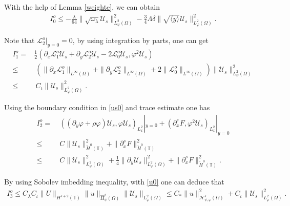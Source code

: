 \documentclass{amsart}
\numberwithin{equation}{section}
\newcommand\y{{{\langle y \rangle}}}
\begin{document}
With the help of Lemma \ref{weighte}, we can obtain
\begin{align*}
I_{0}^{o}\leq -\frac{\lambda}{64}\|\sqrt{\omega_{\lambda}}\mathcal{U}_{s}\|_{L_{\varphi}^{2}(\Omega)}^{2}
          -\frac{3}{4}\Lambda\delta\|\sqrt{\y}\mathcal{U}_{s}\|_{L_{\varphi}^{2}(\Omega)}^{2}.
\end{align*}

Note that $\mathcal{L}_{2}^{o}|_{y=0}=0$, by using integration by parts, one can get
\begin{align*}
I_{1}^{o}
=&\frac{1}{2}(\partial_{x}\mathcal{L}_{1}^{o}\mathcal{U}_{s}+\partial_{y}\mathcal{L}_{2}^{o}\mathcal{U}_{s}-2\mathcal{L}_{0}^{o}\mathcal{U}_{s},\varphi^{2}\mathcal{U}_{s})\\
\leq&~(\|\partial_{x}\mathcal{L}_{1}^{o}\|_{L^{\infty}(\Omega)}+\|\partial_{y}\mathcal{L}_{2}^{o}\|_{L^{\infty}(\Omega)}+2\|\mathcal{L}_{0}^{o}\|_{L^{\infty}(\Omega)})
      \|\mathcal{U}_{s}\|_{L_{\varphi}^{2}(\Omega)}^{2}\\
\leq&~ C_{\iota}\|\mathcal{U}_{s}\|_{L_{\varphi}^{2}(\Omega)}^{2}.
\end{align*}

Using the boundary condition in \eqref{us0} and trace estimate one has
\begin{align*}
I_{2}^{o}
=&~((\partial_{y}\varphi+\rho\varphi)\mathcal{U}_{s},\varphi\mathcal{U}_{s})_{L_{x}^{2}}|_{y=0}
  +(\partial_{x}^{s}F,\varphi^{2}\mathcal{U}_{s})_{L_{x}^{2}}|_{y=0}\\
\leq&~C\|\mathcal{U}_{s}\|_{\mathring{H}^{0}(\mathbb{T})}^{2}+\|\partial_{x}^{s}F\|_{\mathring{H}^{0}(\mathbb{T})}^{2}\\
\leq&~C\|\mathcal{U}_{s}\|_{L_{\varphi}^{2}(\Omega)}^{2}
     +\frac{1}{4}\|\partial_{y}\mathcal{U}_{s}\|_{L_{\varphi}^{2}(\Omega)}^{2}
     +\|\partial_{x}^{s}F\|_{\mathring{H}^{0}(\mathbb{T})}^{2}.
\end{align*}

By using Sobolev imbedding inequality, with \eqref{u0} one can deduce that
\begin{align*}
I_{3}^{o}
\leq C_{\lambda}C_{\iota}\|U\|_{H^{s+2}(\mathbb{T})}\|u\|_{\hat{H}_{\psi}^{s}(\Omega)}\|\mathcal{U}_{s}\|_{L_{\varphi}^{2}(\Omega)}
\leq C_{*}\|u\|_{\mathcal{H}_{\psi,\varphi}^{s}(\Omega)}^{2}+C_{\iota}\|\mathcal{U}_{s}\|_{L_{\varphi}^{2}(\Omega)}^{2}.
\end{align*}
\end{document}
